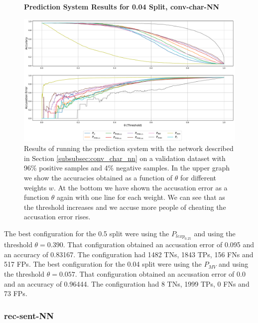 \begin{figure}
    \centering
    \textbf{Prediction System Results for 0.04 Split, \glsdesc{conv-char-NN}}\par\medskip
    \includegraphics[scale=0.33]{./pictures/experiments/conv_char_nn/prediction_system_04}
    \caption{Results of running the prediction system with the network described
        in Section \ref{subsubsec:conv_char_nn} on a validation dataset with
        96\% positive samples and 4\% negative samples. In the upper graph we
        show the accuracies obtained as a function of $\theta$ for different
        weights $w$. At the bottom we have shown the accusation error as a
        function $\theta$ again with one line for each weight. We can see that
        as the threshold increases and we accuse more people of cheating the
        accusation error rises.}
    \label{fig:conv-char-NN-pred-4}
\end{figure}

The best configuration for the 0.5 split were using the $P_{lexp_{0.25}}$
and using the threshold $\theta = 0.390$. That configuration obtained an
accusation error of 0.095 and an accuracy of 0.83167. The configuration had
1482 \glspl{TN}, 1843 \glspl{TP}, 156 \glspl{FN} and 517 \glspl{FP}. The best
configuration for the 0.04 split were using the $P_{MV}$ and using the threshold
$\theta = 0.057$. That configuration obtained an accusation error of 0.0 and
an accuracy of 0.96444. The configuration had 8 \glspl{TN}, 1999 \glspl{TP}, 0
\glspl{FN} and 73 \glspl{FP}.


\subsubsection{\glsdesc{rec-sent-NN}}
\label{subsubsec:prediction_system_rec-sent-NN}

